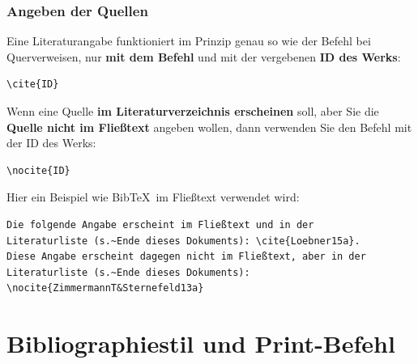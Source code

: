 \begin{frame}[fragile]
\frametitle{Angeben der Quellen}

Eine Literaturangabe funktioniert im Prinzip genau so wie der Befehl  bei Querverweisen, nur \textbf{mit dem Befehl } und mit der vergebenen \textbf{ID des Werks}:

\begin{lstlisting}
\cite{ID}
\end{lstlisting}

\pause

\vspace{.3cm}

Wenn eine Quelle \textbf{im Literaturverzeichnis erscheinen} soll, aber Sie die \textbf{Quelle nicht im Fließtext} angeben wollen, dann verwenden Sie den Befehl \textbf{} mit der ID des Werks:

\begin{lstlisting}
\nocite{ID}
\end{lstlisting}

\end{frame}


\begin{frame}[fragile]

Hier ein Beispiel wie Bib\TeX\ im Fließtext verwendet wird:

\begin{lstlisting}
Die folgende Angabe erscheint im Fließtext und in der 
Literaturliste (s.~Ende dieses Dokuments): \cite{Loebner15a}.
Diese Angabe erscheint dagegen nicht im Fließtext, aber in der 
Literaturliste (s.~Ende dieses Dokuments): 
\nocite{ZimmermannT&Sternefeld13a}
\end{lstlisting}



\end{frame}


\section{Bibliographiestil und Print-Befehl}

